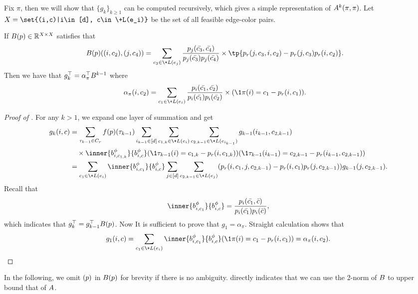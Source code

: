 Fix $\pi$, then we will show that $\{g_k\}_{k\geq 1}$ can be computed recursively, which gives a simple representation of $\*A^k(\pi,\pi)$. Let $X=\set{(i,c)|i\in [d], c\in \+L(e_i)}$ be the set of all feasible edge-color pairs. 
\begin{lemma}\label{lem:recursion_for_g}
    If $\*B(\*p)\in \mathbb R^{X\times X}$ satisfies that
    \begin{align*}
        \*B(\*p)((i,c_2),(j,c_4)) &= 
        \sum_{c_3 \in \+L(e_j)}
        \frac{\*p_j(\bar{c_3},\bar{c_4})}{\*p_j(\bar{c_3})\*p_j(\bar{c_4})}\times \tp{\*p_r(j,c_3,i,c_2) - \*p_r(j,c_3)\*p_r(i,c_2)}.
    \end{align*}
    Then we have that $g_k^\top = \alpha^\top_\pi \*B^{k-1}$ where
    \begin{align*}
        \alpha_\pi(i,c_2) &= \sum_{c_1 \in \+L(e_i)}
         \frac{\*p_i(\bar{c_1},\bar{c_2})}{\*p_i(\bar{c_1})\*p_i(\bar{c_2})}
        \times (\1{\pi(i) = c_1} - \*p_r(i,c_1)).
    \end{align*}
\end{lemma}
\begin{proof}[Proof of ]
    For any $k > 1$, we expand one layer of summation and get
    \begin{align*}
        g_k(i,c) &= \sum_{\tau_{k-1}\in C_r} f(\*p)(\tau_{k-1})\sum_{i_{k-1}\in [d]} \sum_{c_{1,k}\in \+L(e_i)} \sum_{c_{2,k-1}\in \+L(e_{i_{k-1}})}
        g_{k-1}(i_{k-1},c_{2,k-1}) 
        \\&\quad\times \inner{\*b_{i,c_{1,k}}^\phi}{\*b_{i,c}^\phi}(\1{\tau_{k-1}(i) = c_{1,k}} - \*p_r(i,c_{1,k}))
        (\1{\tau_{k-1}(i_{k-1}) = c_{2,k-1}} - \*p_r(i_{k-1}, c_{2,k-1}))
        \\&= \sum_{c_1\in \+L(e_i)}\inner{\*b_{i,c_1}^\phi}{\*b_{i,c}^\phi}\sum_{j\in[d]}\sum_{c_{2,k-1}\in \+L(e_{j})}(\*p_r(i,c_1,j,c_{2,k-1})-\*p_r(i,c_1)\*p_r(j,c_{2,k-1})) g_{k-1}(j,c_{2,k-1}).
    \end{align*}
    Recall that
    $$ 
        \inner{\*b_{i,c_1}^\phi}{\*b_{i,c}^\phi} = 
        \frac{\*p_i(\bar{c_1},\bar{c})}{\*p_i(\bar{c_1})\*p_i(\bar{c})},
    $$
    which indicates that $g_k^\top = g_{k-1}^\top \*B(\*p)$.
    Now It is sufficient to prove that $g_1 = \alpha_{\pi}$.
    Straight calculation shows that
    $$
        g_1(i,c) = \sum_{c_1\in \+L(e_i)} \inner{\*b_{i,c_1}^\phi}{\*b_{i,c}^\phi}(\1{\pi(i) = c_1} - \*p_r(i,c_1)) = \alpha_\pi(i,c_2).
    $$
\end{proof}
In the following, we omit $(\*p)$ in $\*B(\*p)$ for brevity if there is no ambiguity.  directly indicates that we can use the 2-norm of $\*B$ to upper bound that of $\*A$.
